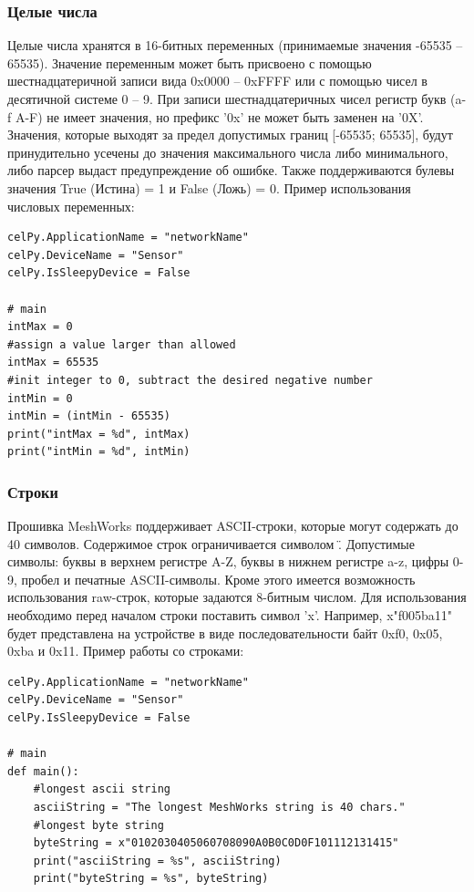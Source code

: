 \documentclass[12pt]{article}
\begin{document}
\subsubsection{Целые числа}
Целые числа хранятся в 16-битных переменных (принимаемые значения -65535 – 65535). 
Значение переменным может быть присвоено с помощью шестнадцатеричной записи вида 0x0000 –
0xFFFF или с помощью чисел в десятичной системе 0 – 9. При записи шестнадцатеричных чисел
регистр букв (a-f A-F) не имеет значения, но префикс '0x' не может быть заменен на '0X'.
Значения, которые выходят за предел допустимых границ [-65535; 65535], будут 
принудительно усечены до значения максимального числа либо минимального, либо 
парсер выдаст предупреждение об ошибке.
Также поддерживаются булевы значения True (Истина) = 1 и False (Ложь) = 0.
Пример использования числовых переменных:
\begin{verbatim}
celPy.ApplicationName = "networkName"
celPy.DeviceName = "Sensor"
celPy.IsSleepyDevice = False

# main
intMax = 0
#assign a value larger than allowed
intMax = 65535
#init integer to 0, subtract the desired negative number
intMin = 0
intMin = (intMin - 65535)
print("intMax = %d", intMax)
print("intMin = %d", intMin)
\end{verbatim}
\subsubsection{Строки}
Прошивка MeshWorks поддерживает ASCII-строки, которые могут содержать до 40 символов.
Содержимое строк ограничивается символом \". Допустимые символы: буквы в верхнем регистре A-Z,
буквы в нижнем регистре a-z, цифры 0-9, пробел и печатные ASCII-символы.
Кроме этого имеется возможность использования raw-строк, которые задаются 8-битным 
числом. Для использования необходимо перед началом строки поставить символ 'x'. 
Например, x"f005ba11" будет представлена на устройстве в виде последовательности 
байт 0xf0, 0x05, 0xba и 0x11.
Пример работы со строками:
\begin{verbatim}
celPy.ApplicationName = "networkName"
celPy.DeviceName = "Sensor"
celPy.IsSleepyDevice = False

# main
def main():
    #longest ascii string
    asciiString = "The longest MeshWorks string is 40 chars."
    #longest byte string
    byteString = x"0102030405060708090A0B0C0D0F101112131415"
    print("asciiString = %s", asciiString)
    print("byteString = %s", byteString)
\end{verbatim}
\end{document}
